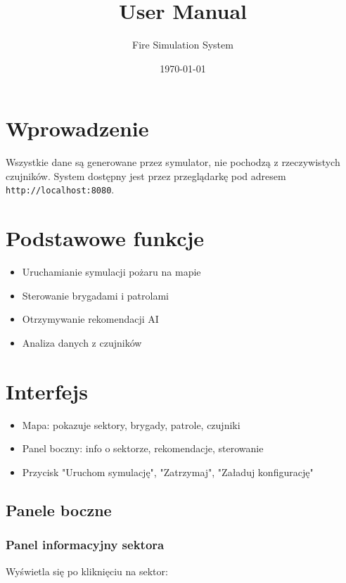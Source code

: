 \documentclass[11pt,a4paper]{article}
\title{User Manual}
\author{Fire Simulation System}
\date{\today}
\begin{document}
\maketitle
\newpage

\section{Wprowadzenie}

Wszystkie dane są generowane przez symulator, nie pochodzą z rzeczywistych czujników. System dostępny jest przez przeglądarkę pod adresem \texttt{http://localhost:8080}.

\section{Podstawowe funkcje}

\begin{itemize}
    \item Uruchamianie symulacji pożaru na mapie
    \item Sterowanie brygadami i patrolami
    \item Otrzymywanie rekomendacji AI
    \item Analiza danych z czujników
\end{itemize}

\section{Interfejs}

\begin{itemize}
    \item Mapa: pokazuje sektory, brygady, patrole, czujniki
    \item Panel boczny: info o sektorze, rekomendacje, sterowanie
    \item Przycisk "Uruchom symulację", "Zatrzymaj", "Załaduj konfigurację"
\end{itemize}

\subsection{Panele boczne}

\subsubsection{Panel informacyjny sektora}

Wyświetla się po kliknięciu na sektor:
\end{document}
